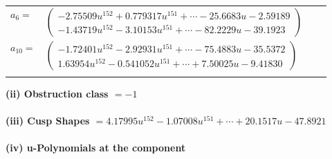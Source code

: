 \documentclass[1p]{elsarticle_modified}
\theoremstyle{definition}
\begin{document}
\begin{tabular}{m{7pt} m{180pt} m{7pt} m{180pt} }
\flushright $a_{6}=$&$\begin{pmatrix}-2.75509 u^{152}+0.779317 u^{151}+\cdots-25.6683 u-2.59189\\-1.43719 u^{152}-3.10153 u^{151}+\cdots-82.2229 u-39.1923\end{pmatrix}$ \\
\flushright $a_{10}=$&$\begin{pmatrix}-1.72401 u^{152}-2.92931 u^{151}+\cdots-75.4883 u-35.5372\\1.63954 u^{152}-0.541052 u^{151}+\cdots+7.50025 u-9.41830\end{pmatrix}$\\&\end{tabular}
\flushleft \textbf{(ii) Obstruction class $= -1$}\\~\\
\flushleft \textbf{(iii) Cusp Shapes $= 4.17995 u^{152}-1.07008 u^{151}+\cdots+20.1517 u-47.8921$}\\~\\
\newpage\renewcommand{\arraystretch}{1}
\flushleft \textbf{(iv) u-Polynomials at the component}\newline \\
\end{document}

